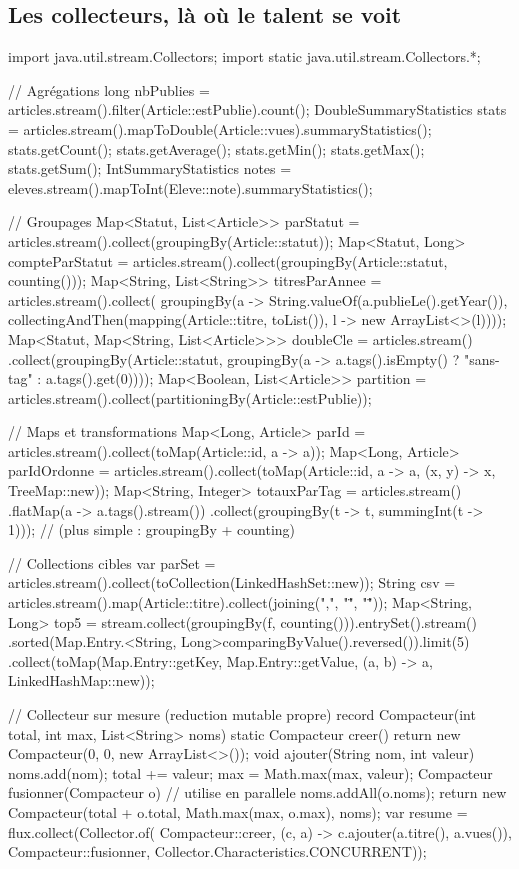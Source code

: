 \documentclass[12pt,a4paper,twoside,openright]{book}
\begin{document}
\subsection{Les collecteurs, l\`a o\`u le talent se voit}

\begin{codejava}
import java.util.stream.Collectors;
import static java.util.stream.Collectors.*;

// Agr\'egations
long nbPublies = articles.stream().filter(Article::estPublie).count();
DoubleSummaryStatistics stats = articles.stream().mapToDouble(Article::vues).summaryStatistics();
stats.getCount(); stats.getAverage(); stats.getMin(); stats.getMax(); stats.getSum();
IntSummaryStatistics notes = eleves.stream().mapToInt(Eleve::note).summaryStatistics();

// Groupages
Map<Statut, List<Article>> parStatut = articles.stream().collect(groupingBy(Article::statut));
Map<Statut, Long> compteParStatut = articles.stream().collect(groupingBy(Article::statut, counting()));
Map<String, List<String>> titresParAnnee = articles.stream().collect(
        groupingBy(a -> String.valueOf(a.publieLe().getYear()),
                   collectingAndThen(mapping(Article::titre, toList()), l -> new ArrayList<>(l))));
Map<Statut, Map<String, List<Article>>> doubleCle = articles.stream()
        .collect(groupingBy(Article::statut, groupingBy(a -> a.tags().isEmpty() ? "sans-tag" : a.tags().get(0))));
Map<Boolean, List<Article>> partition = articles.stream().collect(partitioningBy(Article::estPublie));

// Maps et transformations
Map<Long, Article> parId = articles.stream().collect(toMap(Article::id, a -> a));
Map<Long, Article> parIdOrdonne = articles.stream().collect(toMap(Article::id, a -> a, (x, y) -> x, TreeMap::new));
Map<String, Integer> totauxParTag = articles.stream()
        .flatMap(a -> a.tags().stream())
        .collect(groupingBy(t -> t, summingInt(t -> 1)));
// (plus simple : groupingBy + counting)

// Collections cibles
var parSet = articles.stream().collect(toCollection(LinkedHashSet::new));
String csv = articles.stream().map(Article::titre).collect(joining(",", "\"", "\""));
Map<String, Long> top5 = stream.collect(groupingBy(f, counting())).entrySet().stream()
        .sorted(Map.Entry.<String, Long>comparingByValue().reversed()).limit(5)
        .collect(toMap(Map.Entry::getKey, Map.Entry::getValue, (a, b) -> a, LinkedHashMap::new));

// Collecteur sur mesure (reduction mutable propre)
record Compacteur(int total, int max, List<String> noms) {
    static Compacteur creer() { return new Compacteur(0, 0, new ArrayList<>()); }
    void ajouter(String nom, int valeur) { noms.add(nom); total += valeur; max = Math.max(max, valeur); }
    Compacteur fusionner(Compacteur o) {   // utilise en parallele
        noms.addAll(o.noms); return new Compacteur(total + o.total, Math.max(max, o.max), noms);
    }
}
var resume = flux.collect(Collector.of(
        Compacteur::creer,
        (c, a) -> c.ajouter(a.titre(), a.vues()),
        Compacteur::fusionner,
        Collector.Characteristics.CONCURRENT));


\end{codejava}
\end{document}
